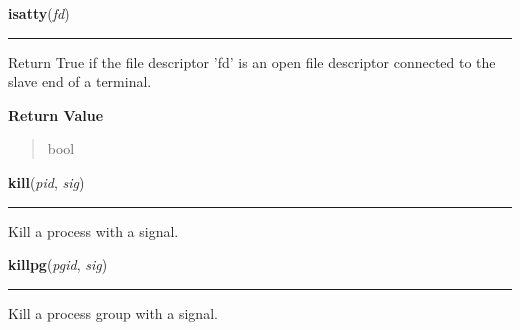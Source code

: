 \hspace{.8\funcindent}\begin{boxedminipage}{\funcwidth}

    \raggedright \textbf{isatty}(\textit{fd})

    \vspace{-1.5ex}

    \rule{\textwidth}{0.5\fboxrule}
\setlength{\parskip}{2ex}
    Return True if the file descriptor 'fd' is an open file descriptor 
    connected to the slave end of a terminal.

\setlength{\parskip}{1ex}
      \textbf{Return Value}
    \vspace{-1ex}

      \begin{quote}
      bool

      \end{quote}

    \end{boxedminipage}

    \label{os:kill}

    \vspace{0.5ex}

\hspace{.8\funcindent}\begin{boxedminipage}{\funcwidth}

    \raggedright \textbf{kill}(\textit{pid}, \textit{sig})

    \vspace{-1.5ex}

    \rule{\textwidth}{0.5\fboxrule}
\setlength{\parskip}{2ex}
    Kill a process with a signal.

\setlength{\parskip}{1ex}
    \end{boxedminipage}

    \label{os:killpg}

    \vspace{0.5ex}

\hspace{.8\funcindent}\begin{boxedminipage}{\funcwidth}

    \raggedright \textbf{killpg}(\textit{pgid}, \textit{sig})

    \vspace{-1.5ex}

    \rule{\textwidth}{0.5\fboxrule}
\setlength{\parskip}{2ex}
    Kill a process group with a signal.

\setlength{\parskip}{1ex}
    \end{boxedminipage}

